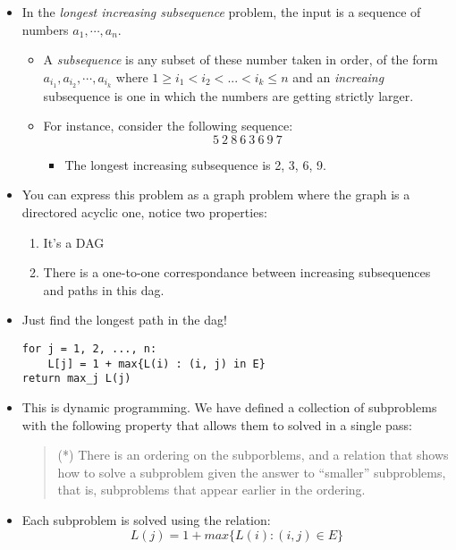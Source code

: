 \documentclass[a4paper,11pt]{article}
\begin{document}
\begin{itemize}
\item
  In the \emph{longest increasing subsequence} problem, the input is a
  sequence of numbers $a_1, \cdots, a_n$.

  \begin{itemize}
  \item
    A \emph{subsequence} is any subset of these number taken in order,
    of the form $a_{i_1}, a_{i_2}, \cdots, a_{i_k}$ where
    $1 \ge i_1 < i_2 < ... < i_k \le n$ and an \emph{increaing}
    subsequence is one in which the numbers are getting strictly larger.
  \item
    For instance, consider the following sequence:
    \[5 \: 2 \: 8 \: 6 \: 3 \: 6 \: 9 \: 7\]

    \begin{itemize}
    \itemsep1pt\parskip0pt
    \item
      The longest increasing subsequence is 2, 3, 6, 9.
    \end{itemize}
  \end{itemize}
\item
  You can express this problem as a graph problem where the graph is a
  directored acyclic one, notice two properties:

  \begin{enumerate}
  \def\labelenumi{\arabic{enumi}.}
  \itemsep1pt\parskip0pt
  \item
    It's a DAG
  \item
    There is a one-to-one correspondance between increasing subsequences
    and paths in this dag.
  \end{enumerate}
\item
  Just find the longest path in the dag!

\begin{verbatim}
for j = 1, 2, ..., n:
    L[j] = 1 + max{L(i) : (i, j) in E}
return max_j L(j)
\end{verbatim}
\item
  This is dynamic programming. We have defined a collection of
  subproblems with the following property that allows them to solved in
  a single pass:

  \begin{quote}
  (*) There is an ordering on the subporblems, and a relation that shows
  how to solve a subproblem given the answer to ``smaller'' subproblems,
  that is, subproblems that appear earlier in the ordering.
  \end{quote}
\item
  Each subproblem is solved using the relation:
  \[L(j) = 1 + max \lbrace L(i) : (i, j) \in E \rbrace\]
\end{itemize}
\end{document}
